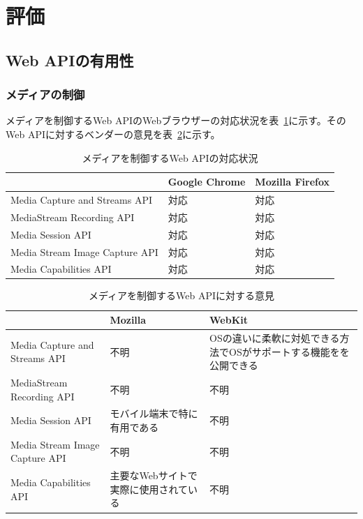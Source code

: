 \section{評価}\label{section:評価}
\subsection{Web APIの有用性}\label{subsection:PWAにおけるWeb APIの有用性}
\subsubsection{メディアの制御}\label{subsubsection:メディアの制御}
メディアを制御するWeb APIのWebブラウザーの対応状況を表~\ref{table:メディアを制御するWeb APIの対応状況}に示す。そのWeb APIに対するベンダーの意見を表~\ref{table:メディアを制御するWeb APIに対する意見}に示す。
\begin{table}
  \caption{メディアを制御するWeb APIの対応状況}
  \label{table:メディアを制御するWeb APIの対応状況}
  \centering
  \begin{tabular}{|p{13em}|p{8em}|p{8em}|}
    \hline
    & Google Chrome & Mozilla Firefox \\ \hline
    Media Capture and Streams API & \cellcolor{green!25}対応 & \cellcolor{green!25}対応 \\ \hline
    MediaStream Recording API & \cellcolor{green!25}対応 & \cellcolor{green!25}対応 \\ \hline
    Media Session API & \cellcolor{green!25}対応 & \cellcolor{green!25}対応 \\ \hline
    Media Stream Image Capture API & \cellcolor{green!25}対応 & \cellcolor{green!25}対応 \\ \hline
    Media Capabilities API & \cellcolor{green!25}対応 & \cellcolor{green!25}対応 \\ \hline
  \end{tabular}
\end{table}
\begin{table}
  \caption{メディアを制御するWeb APIに対する意見}
  \label{table:メディアを制御するWeb APIに対する意見}
    \centering
    \begin{tabular}{|p{13em}|p{13em}|p{13em}|}
        \hline
        & Mozilla & WebKit \\ \hline
        Media Capture and Streams API & 不明 & \cellcolor{green!25}OSの違いに柔軟に対処できる方法でOSがサポートする機能をを公開できる\cite{WebKitMediaCaptureandStreamsAPI} \\ \hline
        MediaStream Recording API & 不明 & 不明 \\ \hline
        Media Session API & \cellcolor{green!25}モバイル端末で特に有用である~\cite{MozillaMediaSessionAPI} & 不明 \\ \hline
        Media Stream Image Capture API & 不明 & 不明 \\ \hline
        Media Capabilities API & \cellcolor{green!25}主要なWebサイトで実際に使用されている\cite{MozillaMediaCapabilitiesAPI} & 不明 \\ \hline
    \end{tabular}
\end{table}
